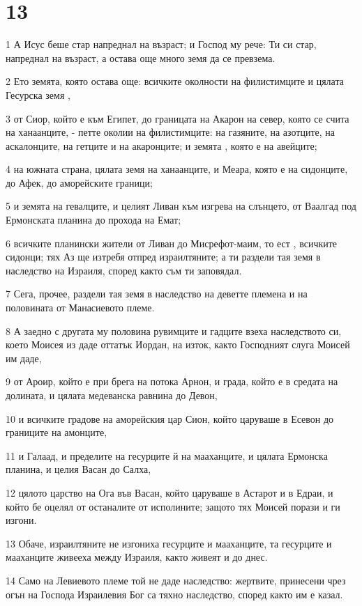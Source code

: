 \chapter{13}

\par 1 А Исус беше стар напреднал на възраст; и Господ му рече: Ти си стар, напреднал на възраст, а остава още много земя да се превзема.
\par 2 Ето земята, която остава още: всичките околности на филистимците и цялата Гесурска земя ,
\par 3 от Сиор, който е към Египет, до границата на Акарон на север, която се счита на ханаанците, - петте околии на филистимците: на газяните, на азотците, на аскалонците, на гетците и на акаронците; и земята , която е на авейците;
\par 4 на южната страна, цялата земя на ханаанците, и Меара, която е на сидонците, до Афек, до аморейските граници;
\par 5 и земята на гевалците, и целият Ливан към изгрева на слънцето, от Ваалгад под Ермонската планина до прохода на Емат;
\par 6 всичките планински жители от Ливан до Мисрефот-маим, то ест , всичките сидонци; тях Аз ще изтребя отпред израилтяните; а ти раздели тая земя в наследство на Израиля, според както съм ти заповядал.
\par 7 Сега, прочее, раздели тая земя в наследство на деветте племена и на половината от Манасиевото племе.
\par 8 А заедно с другата му половина рувимците и гадците взеха наследството си, което Моисея из даде оттатък Иордан, на изток, както Господният слуга Моисей им даде,
\par 9 от Ароир, който е при брега на потока Арнон, и града, който е в средата на долината, и цялата медеванска равнина до Девон,
\par 10 и всичките градове на аморейския цар Сион, който царуваше в Есевон до границите на амонците,
\par 11 и Галаад, и пределите на гесурците й на мааханците, и цялата Ермонска планина, и целия Васан до Салха,
\par 12 цялото царство на Ога във Васан, който царуваше в Астарот и в Едраи, и който бе оцелял от останалите от исполините; защото тях Моисей порази и ги изгони.
\par 13 Обаче, израилтяните не изгониха гесурците и мааханците, та гесурците и мааханците живееха между Израиля, както живеят и до днес.
\par 14 Само на Левиевото племе той не даде наследство: жертвите, принесени чрез огън на Господа Израилевия Бог са тяхно наследство, според както им е казал.
